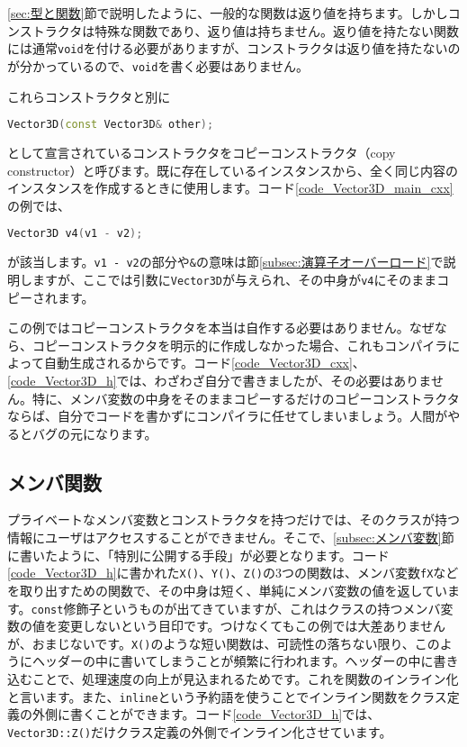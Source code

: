 \ref{sec:型と関数}節で説明したように、一般的な関数は返り値を持ちます。しかしコンストラクタは特殊な関数であり、返り値は持ちません。返り値を持たない関数には通常\texttt{void}を付ける必要がありますが、コンストラクタは返り値を持たないのが分かっているので、\texttt{void}を書く必要はありません。

これらコンストラクタと別に
\begin{lstlisting}[language=c++]
  Vector3D(const Vector3D& other);
\end{lstlisting}
として宣言されているコンストラクタをコピーコンストラクタ（copy constructor）と呼びます。既に存在しているインスタンスから、全く同じ内容のインスタンスを作成するときに使用します。コード\ref{code_Vector3D_main_cxx}の例では、
\begin{lstlisting}[language=c++]
  Vector3D v4(v1 - v2);
\end{lstlisting}
が該当します。\texttt{v1 - v2}の部分や\texttt{\&}の意味は節\ref{subsec:演算子オーバーロード}で説明しますが、ここでは引数に\texttt{Vector3D}が与えられ、その中身が\texttt{v4}にそのままコピーされます。

この例ではコピーコンストラクタを本当は自作する必要はありません。なぜなら、コピーコンストラクタを明示的に作成しなかった場合、これもコンパイラによって自動生成されるからです。コード\ref{code_Vector3D_cxx}、\ref{code_Vector3D_h}では、わざわざ自分で書きましたが、その必要はありません。特に、メンバ変数の中身をそのままコピーするだけのコピーコンストラクタならば、自分でコードを書かずにコンパイラに任せてしまいましょう。人間がやるとバグの元になります。

\subsection{メンバ関数}

プライベートなメンバ変数とコンストラクタを持つだけでは、そのクラスが持つ情報にユーザはアクセスすることができません。そこで、\ref{subsec:メンバ変数}節に書いたように、「特別に公開する手段」が必要となります。コード\ref{code_Vector3D_h}に書かれた\texttt{X()}、\texttt{Y()}、\texttt{Z()}の3つの関数は、メンバ変数\texttt{fX}などを取り出すための関数で、その中身は短く、単純にメンバ変数の値を返しています。\texttt{const}修飾子というものが出てきていますが、これはクラスの持つメンバ変数の値を変更しないという目印です。つけなくてもこの例では大差ありませんが、おまじないです。\texttt{X()}のような短い関数は、可読性の落ちない限り、このようにヘッダーの中に書いてしまうことが頻繁に行われます。ヘッダーの中に書き込むことで、処理速度の向上が見込まれるためです。これを関数のインライン化と言います。また、\texttt{inline}という予約語を使うことでインライン関数をクラス定義の外側に書くことができます。コード\ref{code_Vector3D_h}では、\texttt{Vector3D::Z()}だけクラス定義の外側でインライン化させています。

